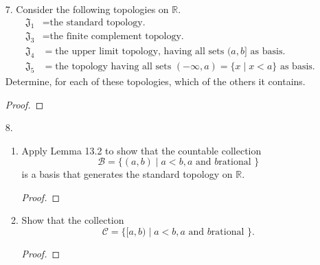 \documentclass[12pt]{article}
\theoremstyle{definition}
\begin{document}
\begin{enumerate}
\begin{proof}
                    Hence, $\mathfrak{J}\subseteq\bigcap\mathcal{T}$. \par\hspace{4mm} 
                    To prove the other inclusion, we can use the same argument as above. 
                    Namely, with $\mathfrak{J}$ being a topology which contains $\mathcal{A}$, it is 
                    then in the intersection of all topologies containing $\mathcal{A}$. 
                    Thus, $\bigcap{T}\subseteq\mathfrak{J}$.
                \end{proof}
        \item[7.] Consider the following topologies on $\mathbb{R}$.
            \begin{equation*}
                \begin{split}
                    \mathfrak{J}_1&=\text{the standard topology.} \\
                    \mathfrak{J}_3&=\text{the finite complement topology.} \\
                    \mathfrak{J}_4&=\text{the upper limit topology, having all sets $(a, b]$ as basis.} \\
                    \mathfrak{J}_5&=\text{the topology having all sets $(-\infty, a)=\{x\mid x<a\}$ as basis.} 
                \end{split}
            \end{equation*}
            Determine, for each of these topologies, which of the others it
            contains.
                \begin{proof}
                    
                \end{proof}
        \item[8.] 
            \begin{enumerate}
                \item Apply Lemma 13.2 to show that the countable collection
                    \begin{equation*}
                        \mathcal{B}=\{(a, b)\mid a<b, a\text{ and  }b \text{
                        rational }\} 
                    \end{equation*}
                is a basis that generates the standard topology on
                $\mathbb{R}$.
                    \begin{proof}
                        
                    \end{proof}
                \item Show that the collection
                    \begin{equation*}
                        \mathcal{C}=\{[a, b)\mid a< b, a\text{ and }b \text{
                        rational }\}. 
                    \end{equation*}
                    \begin{proof}
                        

\end{proof}
\end{enumerate}
\end{enumerate}
\end{document}
